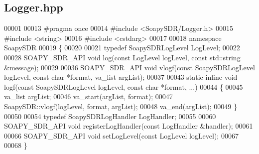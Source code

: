 \subsection{Logger.\+hpp}
\label{Logger_8hpp_source}

\begin{DoxyCode}
00001 
00013 \textcolor{preprocessor}{#pragma once}
00014 \textcolor{preprocessor}{#include <SoapySDR/Logger.h>}
00015 \textcolor{preprocessor}{#include <string>}
00016 \textcolor{preprocessor}{#include <cstdarg>}
00017 
00018 \textcolor{keyword}{namespace }SoapySDR
00019 \{
00020 
00021 \textcolor{keyword}{typedef} SoapySDRLogLevel LogLevel;
00022 
00028 SOAPY_SDR_API \textcolor{keywordtype}{void} log(\textcolor{keyword}{const} LogLevel logLevel, \textcolor{keyword}{const} std::string &message);
00029 
00036 SOAPY_SDR_API \textcolor{keywordtype}{void} vlogf(\textcolor{keyword}{const} SoapySDRLogLevel logLevel, \textcolor{keyword}{const} \textcolor{keywordtype}{char} *format, va\_list argList);
00037 
00043 \textcolor{keyword}{static} \textcolor{keyword}{inline} \textcolor{keywordtype}{void} logf(\textcolor{keyword}{const} SoapySDRLogLevel logLevel, \textcolor{keyword}{const} \textcolor{keywordtype}{char} *format, ...)
00044 \{
00045     va\_list argList;
00046     va\_start(argList, format);
00047     SoapySDR::vlogf(logLevel, format, argList);
00048     va\_end(argList);
00049 \}
00050 
00054 \textcolor{keyword}{typedef} SoapySDRLogHandler LogHandler;
00055 
00060 SOAPY_SDR_API \textcolor{keywordtype}{void} registerLogHandler(\textcolor{keyword}{const} LogHandler &handler);
00061 
00066 SOAPY_SDR_API \textcolor{keywordtype}{void} setLogLevel(\textcolor{keyword}{const} LogLevel logLevel);
00067 
00068 \}
\end{DoxyCode}
